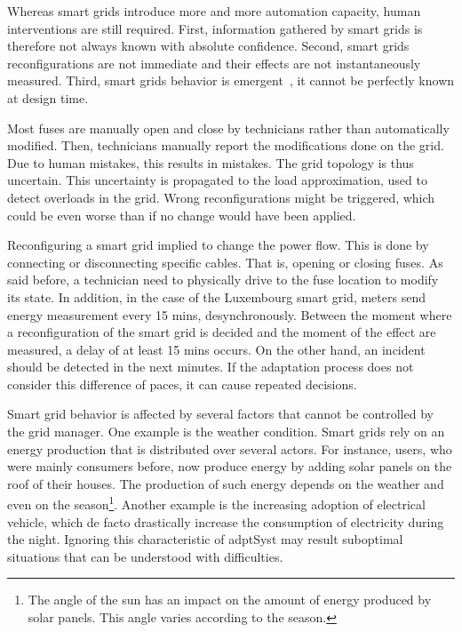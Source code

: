 \bigskip

Whereas smart grids introduce more and more automation capacity, human interventions are still required.
First, information gathered by smart grids is therefore not always known with absolute confidence.
Second, smart grids reconfigurations are not immediate and their effects are not instantaneously measured.
Third, smart grids behavior is emergent~\cite{zio2011uncertainties}, \ie it cannot be perfectly known at design time.

Most fuses are manually open and close by technicians rather than automatically modified.
Then, technicians manually report the modifications done on the grid.
Due to human mistakes, this results in mistakes.
The grid topology is thus uncertain.
This uncertainty is propagated to the load approximation, used to detect overloads in the grid.
Wrong reconfigurations might be triggered, which could be even worse than if no change would have been applied.

Reconfiguring a smart grid implied to change the power flow.
This is done by connecting or disconnecting specific cables.
That is, opening or closing fuses.
As said before, a technician need to physically drive to the fuse location to modify its state.
In addition, in the case of the Luxembourg smart grid, meters send energy measurement every 15 mins, desynchronously.
Between the moment where a reconfiguration of the smart grid is decided and the moment of the effect are measured, a delay of at least 15 mins occurs.
On the other hand, an incident should be detected in the next minutes.
If the adaptation process does not consider this difference of paces, it can cause repeated decisions.

Smart grid behavior is affected by several factors that cannot be controlled by the grid manager.
One example is the weather condition.
Smart grids rely on an energy production that is distributed over several actors.
For instance, users, who were mainly consumers before, now produce energy by adding solar panels on the roof of their houses.
The production of such energy depends on the weather and even on the season\footnote{The angle of the sun has an impact on the amount of energy produced by solar panels. This angle varies according to the season.}.
Another example is the increasing adoption of electrical vehicle, which de facto drastically increase the consumption of electricity during the night.
Ignoring this characteristic of \gls{adptSyst} may result suboptimal situations that can be understood with difficulties.
